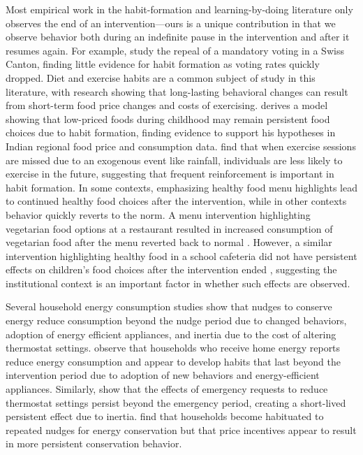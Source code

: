 \documentclass[12pt]{article}
\begin{document}
Most empirical work in the habit-formation and learning-by-doing literature only observes the end of an intervention---ours is a unique contribution in that we observe behavior both during an indefinite pause in the intervention and after it resumes again.  For example, \cite{bechteletal2018} study the repeal of a mandatory voting in a Swiss Canton, finding little evidence for habit formation as voting rates quickly dropped.  Diet and exercise habits are a common subject of study in this literature, with research showing that long-lasting behavioral changes can result from short-term food price changes and costs of exercising.  \cite{atkin2013} derives a model showing that low-priced foods during childhood may remain persistent food choices due to habit formation, finding evidence to support his hypotheses in Indian regional food price and consumption data.  \cite{HARRIS2019} find that when exercise sessions are missed due to an exogenous event like rainfall, individuals are less likely to exercise in the future, suggesting that frequent reinforcement is important in habit formation. In some contexts, emphasizing healthy food menu highlights lead to continued healthy food choices after the intervention, while in other contexts behavior quickly reverts to the norm.  A menu intervention highlighting vegetarian food options at a restaurant resulted in increased consumption of vegetarian food after the menu reverted back to normal \citep{KURZ2018}. However, a similar intervention highlighting healthy food in a school cafeteria did not have persistent effects on children's food choices after the intervention ended \citep{OZTURK2020}, suggesting the institutional context is an important factor in whether such effects are observed.  

Several household energy consumption studies show that nudges to conserve energy reduce consumption beyond the nudge period due to changed behaviors, adoption of energy efficient appliances, and inertia due to the cost of altering thermostat settings.  \cite{allcottrogers2014} observe that households who receive home energy reports reduce energy consumption and appear to develop habits that last beyond the intervention period due to adoption of new behaviors and energy-efficient appliances.  Similarly, \cite{brewercrozier2022} show that the effects of emergency requests to reduce thermostat settings persist beyond the emergency period, creating a short-lived persistent effect due to inertia. \cite{itoidatanaka2018} find that households become habituated to repeated nudges for energy conservation but that price incentives appear to result in more persistent conservation behavior.
\end{document}
